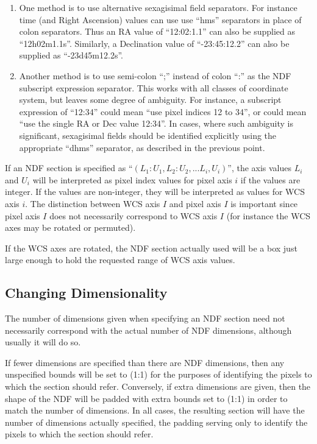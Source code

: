 \begin{enumerate}
\item One method is to use alternative sexagisimal field separators. For
instance time (and Right Ascension) values can use use ``hms''
separators in place of colon separators. Thus an RA value of ``12:02:1.1'' 
can also be supplied as ``12h02m1.1s''. Similarly, a Declination value of 
``-23:45:12.2'' can also be supplied as ``-23d45m12.2s''.
\item Another method is to use semi-colon ``;'' instead of colon ``:'' as
the NDF subscript expression separator. This works with all classes of
coordinate system, but leaves some degree of ambiguity. For instance,
a subscript expression of ``12:34'' could mean ``use pixel indices 12 to
34'', or could mean ``use the single RA or Dec value 12:34''. In cases,
where such ambiguity is significant, sexagisimal fields should be
identified explicitly using the appropriate ``dhms'' separator, as
described in the previous point.
\end{enumerate}

If an NDF section is specified as ``$(L_{1}:U_{1},L_{2}:U_{2},  ...  L_{i},U_{i})$'', 
the axis values $L_{i}$ and $U_{i}$ will be interpreted as pixel index
values for pixel axis $i$ if the values are integer. If the values are
non-integer, they will be interpreted as values for WCS axis $i$. The
distinction between WCS axis $I$ and pixel axis $I$ is important since
pixel axis $I$ does not necessarily correspond to WCS axis $I$ (for
instance the WCS axes may be rotated or permuted).

If the WCS axes are rotated, the NDF section actually used will be a box
just large enough to hold the requested range of WCS axis values.


\subsection{Changing Dimensionality}

The number of dimensions given when specifying an NDF section need not
necessarily correspond with the actual number of NDF dimensions, although
usually it will do so.

If fewer dimensions are specified than there are NDF dimensions, then any
unspecified bounds will be set to (1:1) for the purposes of identifying the
pixels to which the section should refer. Conversely, if extra dimensions are
given, then the shape of the NDF will be padded with extra bounds set
to (1:1) in order to match the number of dimensions. In all cases, the
resulting section will have the number of dimensions actually
specified, the padding serving only to identify the pixels to which
the section should refer.

